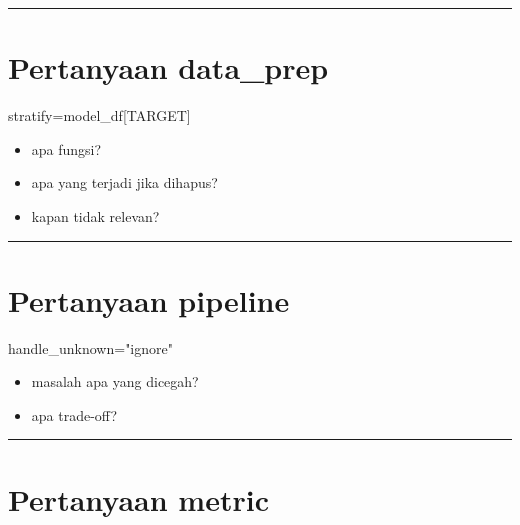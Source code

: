 \documentclass[
  indonesian,
  letterpaper,
  DIV=11,
  numbers=noendperiod]{scrreprt}
\newenvironment{Shaded}{\begin{snugshade}}{\end{snugshade}}
\newcommand{\NormalTok}[1]{\textcolor[rgb]{0.00,0.23,0.31}{#1}}
\newcommand{\OperatorTok}[1]{\textcolor[rgb]{0.37,0.37,0.37}{#1}}
\newcommand{\StringTok}[1]{\textcolor[rgb]{0.13,0.47,0.30}{#1}}
\providecommand{\tightlist}{%
  \setlength{\itemsep}{0pt}\setlength{\parskip}{0pt}}
\begin{document}
\begin{center}\rule{0.5\linewidth}{0.5pt}\end{center}

\section{Pertanyaan data\_prep}\label{pertanyaan-data_prep}

\begin{Shaded}
\begin{Highlighting}[]
\NormalTok{stratify}\OperatorTok{=}\NormalTok{model\_df[TARGET]}
\end{Highlighting}
\end{Shaded}

\begin{itemize}
\tightlist
\item
  apa fungsi?
\item
  apa yang terjadi jika dihapus?
\item
  kapan tidak relevan?
\end{itemize}

\begin{center}\rule{0.5\linewidth}{0.5pt}\end{center}

\section{Pertanyaan pipeline}\label{pertanyaan-pipeline}

\begin{Shaded}
\begin{Highlighting}[]
\NormalTok{handle\_unknown}\OperatorTok{=}\StringTok{"ignore"}
\end{Highlighting}
\end{Shaded}

\begin{itemize}
\tightlist
\item
  masalah apa yang dicegah?
\item
  apa trade-off?
\end{itemize}

\begin{center}\rule{0.5\linewidth}{0.5pt}\end{center}

\section{Pertanyaan metric}\label{pertanyaan-metric}
\end{document}
